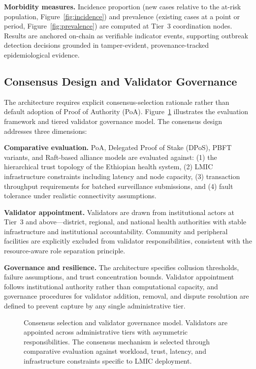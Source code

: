 \documentclass[AMA,LATO1COL]{WileyNJD-v2}
\begin{document}
\textbf{Morbidity measures.} Incidence proportion (new cases relative to the at-risk population, Figure~\ref{fig:incidence}) and prevalence (existing cases at a point or period, Figure~\ref{fig:prevalence}) are computed at Tier~3 coordination nodes.\cite{cdc2012principles} Results are anchored on-chain as verifiable indicator events, supporting outbreak detection decisions grounded in tamper-evident, provenance-tracked epidemiological evidence.

\subsection{Consensus Design and Validator Governance}\label{subsec:consensus}

The architecture requires explicit consensus-selection rationale rather than default adoption of Proof of Authority (PoA). Figure~\ref{fig:consensus} illustrates the evaluation framework and tiered validator governance model. The consensus design addresses three dimensions:

\textbf{Comparative evaluation.} PoA, Delegated Proof of Stake (DPoS), PBFT variants, and Raft-based alliance models are evaluated against: (1) the hierarchical trust topology of the Ethiopian health system, (2) LMIC infrastructure constraints including latency and node capacity, (3) transaction throughput requirements for batched surveillance submissions, and (4) fault tolerance under realistic connectivity assumptions.

\textbf{Validator appointment.} Validators are drawn from institutional actors at Tier~3 and above---district, regional, and national health authorities with stable infrastructure and institutional accountability. Community and peripheral facilities are explicitly excluded from validator responsibilities, consistent with the resource-aware role separation principle.

\textbf{Governance and resilience.} The architecture specifies collusion thresholds, failure assumptions, and trust concentration bounds. Validator appointment follows institutional authority rather than computational capacity, and governance procedures for validator addition, removal, and dispute resolution are defined to prevent capture by any single administrative tier.


\begin{figure}[!ht]
\centering
{}
\caption{Consensus selection and validator governance model. Validators are appointed across administrative tiers with asymmetric responsibilities. The consensus mechanism is selected through comparative evaluation against workload, trust, latency, and infrastructure constraints specific to LMIC deployment.}\label{fig:consensus}
\end{figure}
\end{document}
